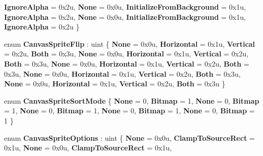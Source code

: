\begin{DoxyCompactItemize}
\newline
{\bfseries Ignore\+Alpha} = 0x2u, 
{\bfseries None} = 0x0u, 
{\bfseries Initialize\+From\+Background} = 0x1u, 
{\bfseries Ignore\+Alpha} = 0x2u, 
\newline
{\bfseries None} = 0x0u, 
{\bfseries Initialize\+From\+Background} = 0x1u, 
{\bfseries Ignore\+Alpha} = 0x2u
 \}
\item 
\mbox{\label{namespace_microsoft_1_1_graphics_1_1_canvas_ab01b519fa39176572bedd129db922814}} 
enum {\bfseries Canvas\+Sprite\+Flip} \+: uint \{ \newline
{\bfseries None} = 0x0u, 
{\bfseries Horizontal} = 0x1u, 
{\bfseries Vertical} = 0x2u, 
{\bfseries Both} = 0x3u, 
\newline
{\bfseries None} = 0x0u, 
{\bfseries Horizontal} = 0x1u, 
{\bfseries Vertical} = 0x2u, 
{\bfseries Both} = 0x3u, 
\newline
{\bfseries None} = 0x0u, 
{\bfseries Horizontal} = 0x1u, 
{\bfseries Vertical} = 0x2u, 
{\bfseries Both} = 0x3u, 
\newline
{\bfseries None} = 0x0u, 
{\bfseries Horizontal} = 0x1u, 
{\bfseries Vertical} = 0x2u, 
{\bfseries Both} = 0x3u, 
\newline
{\bfseries None} = 0x0u, 
{\bfseries Horizontal} = 0x1u, 
{\bfseries Vertical} = 0x2u, 
{\bfseries Both} = 0x3u
 \}
\item 
\mbox{\label{namespace_microsoft_1_1_graphics_1_1_canvas_a78964f5963aadeacf020f306893b03c8}} 
enum {\bfseries Canvas\+Sprite\+Sort\+Mode} \{ \newline
{\bfseries None} = 0, 
{\bfseries Bitmap} = 1, 
{\bfseries None} = 0, 
{\bfseries Bitmap} = 1, 
\newline
{\bfseries None} = 0, 
{\bfseries Bitmap} = 1, 
{\bfseries None} = 0, 
{\bfseries Bitmap} = 1, 
\newline
{\bfseries None} = 0, 
{\bfseries Bitmap} = 1
 \}
\item 
\mbox{\label{namespace_microsoft_1_1_graphics_1_1_canvas_ab6862b1a93938e7824d0fff2e6892380}} 
enum {\bfseries Canvas\+Sprite\+Options} \+: uint \{ \newline
{\bfseries None} = 0x0u, 
{\bfseries Clamp\+To\+Source\+Rect} = 0x1u, 
{\bfseries None} = 0x0u, 
{\bfseries Clamp\+To\+Source\+Rect} = 0x1u, 

\end{DoxyCompactItemize}
